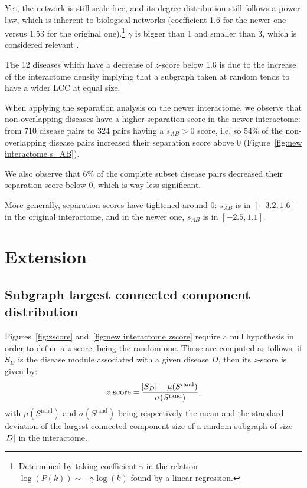 \documentclass[letterpaper]{article}
\begin{document}
	Yet, the network is still scale-free, and its degree distribution still follows a power law, which is inherent to
	biological networks (coefficient 1.6 for the newer one versus 1.53 for the original one).\footnote{Determined by
	taking coefficient $\gamma$ in the relation $\log(P(k)) \sim -\gamma\log(k)$ found by a linear regression.}
	$\gamma$ is bigger than 1 and smaller than 3, which is considered
	relevant \citep{UnderstandingTheCellFunctionalOrganization,vidal2011interactome}.

	The 12 diseases which have a decrease of $z$-score below 1.6 is due to the increase of the interactome density implying
	that a subgraph taken at random tends to have a wider LCC at equal size.

	When applying the separation analysis on the newer interactome, we observe that non-overlapping diseases have a higher
	separation score in the newer interactome: from 710 disease pairs to 324 pairs having a $s_{AB} > 0$ score, i.e.
	so $54\%$ of the non-overlapping disease pairs increased their separation score above 0 (Figure~\ref{fig:new interactome s_AB}).

	We also observe that $6\%$ of the complete subset disease pairs decreased their separation score below 0, which is way
	less significant.

	More generally, separation scores have tightened around 0: $s_{AB}$ is in $[-3.2, 1.6]$ in the original interactome, and
	in the newer one, $s_{AB}$ is in $[-2.5, 1.1]$.

\section{Extension}
	\subsection{Subgraph largest connected component distribution}
	Figures~\ref{fig:zscore} and~\ref{fig:new interactome zscore} require a null hypothesis in order to define a $z$-score,
	being the random one. Those are computed as follows: if $S_D$ is the disease module associated with a given disease $D$,
	then its $z$-score is given by:
	\begin{equation}
		z\text{-score} = \frac {\abs {S_D} - \mu(S^{\text{rand}})}{\sigma(S^{\text{rand}})},
	\end{equation}
	with $\mu(S^{\text{rand}})$ and $\sigma(S^{\text{rand}})$ being respectively the mean and the
	standard deviation of the largest connected component size of a random subgraph of size $\abs D$
	in the interactome.
\end{document}
